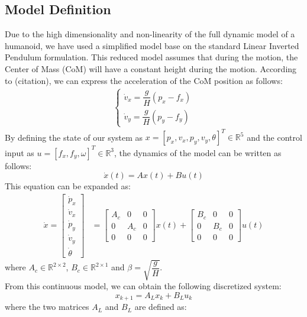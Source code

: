 \subsection{Model Definition}
Due to the high dimensionality and non-linearity of the full dynamic model of a humanoid, we have used a simplified model base on the standard Linear Inverted Pendulum formulation.
This reduced model assumes that during the motion, the Center of Mass (CoM) will have a constant height during the motion.
According to (citation), we can express the acceleration of the CoM position as follows:
\begin{align}
    \begin{cases}
        \dot{v}_{x} = \dfrac{g}{H}(p_{x} - f_{x})
        \\[1ex]
        \dot{v}_{y} = \dfrac{g}{H}(p_{y} - f_{y})
    \end{cases}
\end{align}
By defining the state of our system as $x = [p_{x}, v_{x}, p_{y}, v_{y}, \theta]^T \in \mathbb{R}^5$ and the control input as $u = [f_{x}, f_{y}, \omega]^T \in \mathbb{R}^3$, the dynamics of the model can be written as follows:
\begin{equation}
    \dot{x}(t) = A x(t) + B u(t)
\end{equation}
This equation can be expanded as:
\begin{align}
    \dot{x} = 
    \begin{bmatrix}
        \dot{p}_{x}\\
        \dot{v}_{x}\\
        \dot{p}_{y}\\
        \dot{v}_{y}\\
        \dot{\theta}
    \end{bmatrix}
    &= 
    \begin{bmatrix}
        A_c & 0 & 0 \\
        0 & A_c & 0 \\
        0 & 0 & 0
    \end{bmatrix}
    x(t) +
    \begin{bmatrix}
        B_c & 0 & 0 \\
        0 & B_c & 0 \\
        0 & 0 & 0
    \end{bmatrix}
    u(t)
\end{align}
where $A_{c} \in \mathbb{R}^{2 \times 2}$, $B_{c} \in \mathbb{R}^{2 \times 1}$ and $\beta = \sqrt{\dfrac{g}{H}}$.
\\
From this continuous model, we can obtain the following discretized system: 
\begin{equation}
    x_{k+1} = A_{L}x_{k} + B_{L}u_{k}
\end{equation}
where the two matrices $A_L$ and $B_L$ are defined as:

